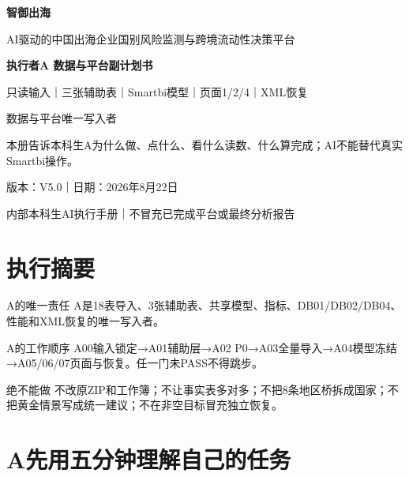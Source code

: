 \documentclass[UTF8,openany,zihao=-4]{ctexbook}
\renewcommand{\_}{\textunderscore\allowbreak}
\begin{document}
\begin{titlepage}
\pagecolor{Navy}\color{white}
\centering
\vspace*{1.8cm}
{\Huge\bfseries 智御出海\par}
\vspace{0.45cm}
{\Large AI驱动的中国出海企业国别风险监测与跨境流动性决策平台\par}
\vspace{1.0cm}
{\LARGE\bfseries 执行者A 数据与平台副计划书\par}
\vspace{0.55cm}
{\Large 只读输入｜三张辅助表｜Smartbi模型｜页面1/2/4｜XML恢复\par}
\vspace{0.8cm}
\begin{tcolorbox}[colback=white!7!Navy,colframe=Gold,width=.88\textwidth,boxrule=1.1pt,arc=1mm]
\centering\large 数据与平台唯一写入者
\end{tcolorbox}
\vfill
\begin{tcolorbox}[colback=white!9!Navy,colframe=Gold,width=.88\textwidth,boxrule=1pt,arc=1mm]
本册告诉本科生A为什么做、点什么、看什么读数、什么算完成；AI不能替代真实Smartbi操作。
\end{tcolorbox}
\vfill
{\large 版本：V5.0｜日期：2026年8月22日\par}
{\large 内部本科生AI执行手册｜不冒充已完成平台或最终分析报告\par}
\end{titlepage}
\nopagecolor\color{black}
\frontmatter
\chapter*{执行摘要}
\begin{statusbox}{A的唯一责任}
A是18表导入、3张辅助表、共享模型、指标、DB01/DB02/DB04、性能和XML恢复的唯一写入者。

\end{statusbox}
\begin{gatebox}{A的工作顺序}
A00输入锁定→A01辅助层→A02 P0→A03全量导入→A04模型冻结→A05/06/07页面与恢复。任一门未PASS不得跳步。

\end{gatebox}
\begin{dangerbox}{绝不能做}
不改原ZIP和工作簿；不让事实表多对多；不把8条地区桥拆成国家；不把黄金情景写成统一建议；不在非空目标冒充独立恢复。

\end{dangerbox}
\tableofcontents
\mainmatter
\chapter{A先用五分钟理解自己的任务}
\end{document}
